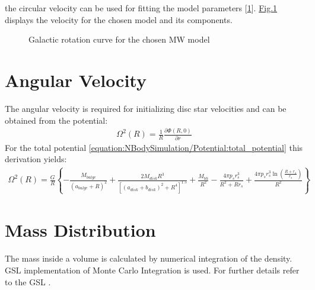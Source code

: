 \documentclass[letterpaper,10pt,english]{sphinxmanual}
\begin{document}
\sphinxAtStartPar
the circular velocity can be used for fitting the model parameters {[}\hyperlink{cite.NBodySimulation/Appendix:id60}{1}{]}.
\hyperref[\detokenize{NBodySimulation/Potential:fig-potential-circular-velocity}]{Fig.\@ \ref{\detokenize{NBodySimulation/Potential:fig-potential-circular-velocity}}} displays the velocity for the chosen model and its components.

\begin{figure}[htbp]
\centering
\capstart

\noindent{}
\caption{Galactic rotation curve for the chosen MW model}\label{\detokenize{NBodySimulation/Potential:id9}}\label{\detokenize{NBodySimulation/Potential:fig-potential-circular-velocity}}\end{figure}


\section{Angular Velocity}
\label{\detokenize{NBodySimulation/Potential:angular-velocity}}
\sphinxAtStartPar
The angular velocity is required for initializing disc star velocities and can be obtained from the potential:
\begin{equation*}
\begin{split}\Omega ^{2}\left ( R \right ) = \frac{1}{R}\frac{\partial \Phi \left ( R,0 \right )}{\partial r}\end{split}
\end{equation*}
\sphinxAtStartPar
For the total potential \eqref{equation:NBodySimulation/Potential:total_potential} this derivation yields:
\begin{equation*}
\begin{split}\Omega ^{2}\left ( R \right ) = \frac{G}{R} \left\{-\frac{M_{bulge}}{(a_{bulge}+R)^2}+\frac{2 M_{disk} R^3}{\left[\left(a_{disk}+b_{disk}\right)^2+R^4\right]^{1.5}}+\frac{M_{bh}}{R^2}-\frac{4 \pi  p_{s} r_{s}^3}{R^2+R r_{s}}+\frac{4 \pi  p_{s} r_{s}^3 \ln \left(\frac{R+r_{s}}{r_{s}}\right)}{R^2}\right\}\end{split}
\end{equation*}

\section{Mass Distribution}
\label{\detokenize{NBodySimulation/Potential:mass-distribution}}
\sphinxAtStartPar
The mass inside a volume is calculated by numerical integration of the density.
GSL implementation of Monte Carlo Integration is used. For further details refer to the GSL .
\end{document}
